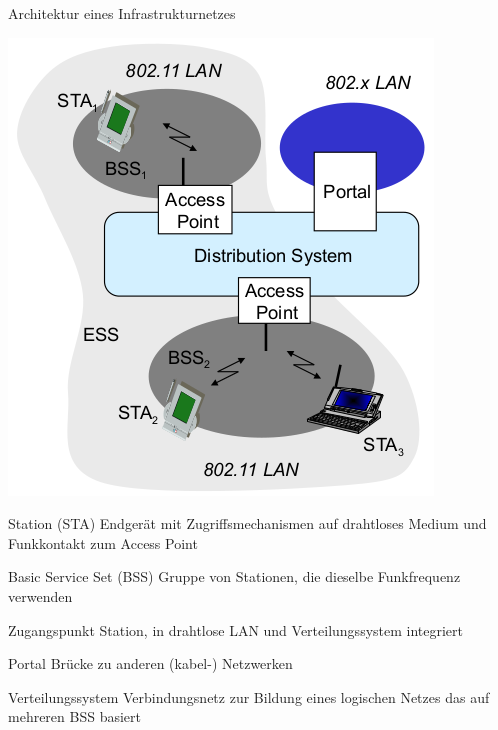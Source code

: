 \documentclass[a4paper]{article}
\begin{document}
\begin{multicols}{3}
      Architektur eines Infrastrukturnetzes
      \begin{multicols}{2}
            \includegraphics[width=.8\linewidth]{Assets/NetworkSecurity-802.11-network-architecture.png}

            \begin{description*}
                  \item[Station (STA)] Endgerät mit Zugriffsmechanismen auf drahtloses Medium und Funkkontakt zum Access Point
                  \item[Basic Service Set (BSS)] Gruppe von Stationen, die dieselbe Funkfrequenz verwenden
                  \item[Zugangspunkt] Station, in drahtlose LAN und Verteilungssystem integriert
                  \item[Portal] Brücke zu anderen (kabel-) Netzwerken
                  \item[Verteilungssystem] Verbindungsnetz zur Bildung eines logischen Netzes das auf mehreren BSS basiert
            \end{description*}
      \end{multicols}


\end{multicols}
\end{document}
